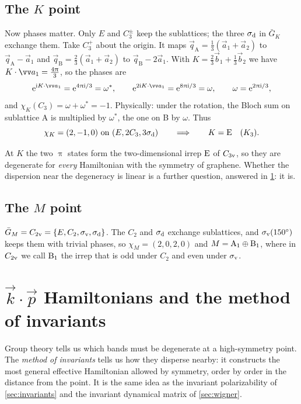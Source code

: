 \subsection{The \texorpdfstring{$K$}{K} point}\label{sec:Kpoint}
Now phases matter. Only $E$ and $C_3^\pm$ keep the sublattices; the three $\sigma_{\mathrm{d}}$ in
$\bar{G}_K$ exchange them. Take $C_3^+$ about the origin. It maps
$\vec{q}_{\mathrm{A}}=\tfrac13(\vec{a}_1+\vec{a}_2)$ to $\vec{q}_{\mathrm{A}}-\vec{a}_1$ and
$\vec{q}_{\mathrm{B}}=\tfrac23(\vec{a}_1+\vec{a}_2)$ to $\vec{q}_{\mathrm{B}}-2\vec{a}_1$. With
$K=\tfrac23\vec{b}_1+\tfrac13\vec{b}_2$ we have $K\cdot\vec{a}_1=\tfrac{4\cpi}{3}$, so the
phases are
\[
\ee^{\ii K\cdot\vec{a}_1}=\ee^{4\cpi\ii/3}=\omega^{*},\qquad
\ee^{2\ii K\cdot\vec{a}_1}=\ee^{8\cpi\ii/3}=\omega,\qquad
\omega=\ee^{2\cpi\ii/3},
\]
and $\chi_K(C_3)=\omega+\omega^{*}=-1$. Physically: under the rotation, the Bloch sum
on sublattice A is multiplied by $\omega^{*}$, the one on B by $\omega$. Thus
\[
\chi_K=(2,-1,0)\ \text{on}\ (E,2C_3,3\sd)\qquad\Longrightarrow\qquad K=\irr{E}\quad(K_3).
\]
\begin{keyresult}
At $K$ the two $\uppi$ states form the two-dimensional irrep $\mathrm{E}$ of $C_{3\mathrm{v}}$, so they
are degenerate for \emph{every} Hamiltonian with the symmetry of graphene. Whether the
dispersion near the degeneracy is linear is a further question, answered in
\cref{sec:kp}: it is.
\end{keyresult}

\subsection{The \texorpdfstring{$M$}{M} point}
$\bar{G}_M=C_{2\mathrm{v}}=\{E,C_2,\sigma_{\mathrm{v}},\sigma_{\mathrm{d}}\}$. The $C_2$ and $\sigma_{\mathrm{d}}$ exchange sublattices, and
$\sigma_{\mathrm{v}}(150^\circ)$ keeps them with trivial phases, so $\chi_M=(2,0,2,0)$ and
$M=\mathrm{A}_1\oplus\mathrm{B}_1$, where in $C_{2\mathrm{v}}$ we call $\mathrm{B}_1$ the irrep that is
odd under $C_2$ and even under $\sigma_{\mathrm{v}}$.

\section{\texorpdfstring{$\vec{k}\cdot\vec{p}$}{k.p} Hamiltonians and the method of invariants\beyondmark}\label{sec:kp}

Group theory tells us which bands must be degenerate at a high-symmetry point. The
\emph{method of invariants} tells us how they disperse nearby: it constructs the most
general effective Hamiltonian allowed by symmetry, order by order in the distance from
the point. It is the same idea as the invariant polarizability of \cref{sec:invariants}
and the invariant dynamical matrix of \cref{sec:wigner}.

